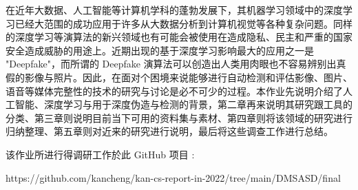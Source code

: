 \begin{cabstract}
在近年大数据、人工智能等计算机学科的蓬勃发展下，其机器学习领域中的深度学习已经大范围的成功应用于许多从大数据分析到计算机视觉等各种复杂问题。同样的深度学习等演算法的新兴领域也有可能会被使用在造成隐私、民主和严重的国家安全造成威胁的用途上。近期出现的基于深度学习影响最大的应用之一是 "Deepfake"，而所谓的 Deepfake 演算法可以创造出人类用肉眼也不容易辨别出真假的影像与照片。因此，在面对个困境来说能够进行自动检测和评估影像、图片、语音等媒体完整性的技术的研究与讨论是必不可少的过程。本作业先说明介绍了人工智能、深度学习与用于深度伪造与检测的背景，第二章再来说明其研究跟工具的分类、第三章则说明目前当下可用的资料集与素材、第四章则将该领域的研究进行归纳整理、第五章则对近来的研究进行说明，最后将这些调查工作进行总结。

该作业所进行得调研工作於此 GitHub 项目 :

https://github.com/kancheng/kan-cs-report-in-2022/tree/main/DMSASD/final

\end{cabstract}


